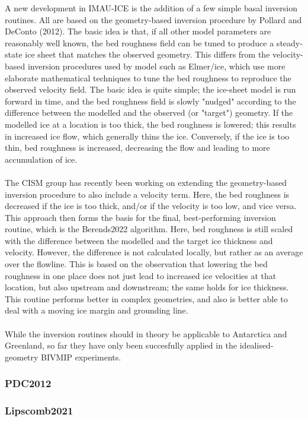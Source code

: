 \documentclass{article}
\begin{document}
A new development in IMAU-ICE is the addition of a few simple basal inversion routines. All are based on the geometry-based inversion procedure by Pollard and DeConto (2012). The basic idea is that, if all other model parameters are reasonably well known, the bed roughness field can be tuned to produce a steady-state ice sheet that matches the observed geometry. This differs from the velocity-based inversion procedures used by model such as Elmer/ice, which use more elaborate mathematical techniques to tune the bed roughness to reproduce the observed velocity field. The basic idea is quite simple; the ice-sheet model is run forward in time, and the bed roughness field is slowly "nudged" according to the difference between the modelled and the observed (or "target") geometry. If the modelled ice at a location is too thick, the bed roughness is lowered; this results in increased ice flow, which generally thins the ice. Conversely, if the ice is too thin, bed roughness is increased, decreasing the flow and leading to more accumulation of ice.\\
\\
The CISM group has recently been working on extending the geometry-based inversion procedure to also include a velocity term. Here, the bed roughness is decreased if the ice is too thick, and/or if the velocity is too low, and vice versa. This approach then forms the basis for the final, best-performing inversion routine, which is the Berends2022 algorithm. Here, bed roughness is still scaled with the difference between the modelled and the target ice thickness and velocity. However, the difference is not calculated locally, but rather as an average over the flowline. This is based on the observation that lowering the bed roughness in one place does not just lead to increased ice velocities at that location, but also upstream and downstream; the same holds for ice thickness. This routine performs better in complex geometries, and also is better able to deal with a moving ice margin and grounding line.\\
\\
While the inversion routines should in theory be applicable to Antarctica and Greenland, so far they have only been succesfully applied in the idealised-geometry BIVMIP experiments.

\subsubsection{PDC2012}

\subsubsection{Lipscomb2021}
\end{document}
